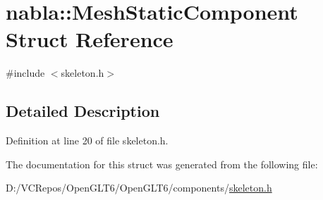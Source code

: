 \hypertarget{structnabla_1_1_mesh_static_component}{}\section{nabla\+::Mesh\+Static\+Component Struct Reference}
\label{structnabla_1_1_mesh_static_component}


{\ttfamily \#include $<$skeleton.\+h$>$}



\subsection{Detailed Description}


Definition at line 20 of file skeleton.\+h.



The documentation for this struct was generated from the following file\+:\begin{DoxyCompactItemize}
\item 
D\+:/\+V\+C\+Repos/\+Open\+G\+L\+T6/\+Open\+G\+L\+T6/components/\mbox{\hyperlink{skeleton_8h}{skeleton.\+h}}\end{DoxyCompactItemize}
